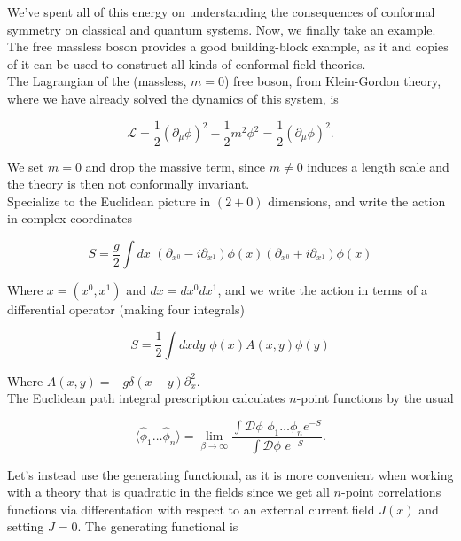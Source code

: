 
\noindent We've spent all of this energy on understanding the consequences of conformal symmetry on classical and quantum systems. Now, we finally take an example. The free massless boson provides a good building-block example, as it and copies of it can be used to construct all kinds of conformal field theories. \\

\noindent The Lagrangian of the (massless, $m=0$) free boson, from Klein-Gordon theory, where we have already solved the dynamics of this system, is

\begin{equation}
\mathcal{L} = \frac{1}{2} (\partial_\mu \phi)^2 - \frac{1}{2} m^2 \phi^2 = \frac{1}{2} (\partial_\mu \phi)^2.
\end{equation}

\noindent We set $m=0$ and drop the massive term, since $m \ne 0$ induces a length scale and the theory is then not conformally invariant. \\

\noindent Specialize to the Euclidean picture in $(2+0)$ dimensions, and write the action in complex coordinates

\begin{equation}
S = \frac{g}{2} \int dx \,\, (\partial_{x^0} - i \partial_{x^1} ) \phi (x) (\partial_{x^0} + i \partial_{x^1} ) \phi (x)
\end{equation}

\noindent Where $x = (x^0, x^1)$ and $dx = dx^0 dx^1$, and we write the action in terms of a differential operator (making four integrals)

\begin{equation}
S = \frac{1}{2} \int dx dy \,\, \phi (x) A (x,y) \phi (y)
\end{equation}

\noindent Where $A(x,y) = -g \delta (x-y) \partial_x^2$. \\

\noindent The Euclidean path integral prescription calculates $n$-point functions by the usual

\begin{equation}
\langle \hat{\phi}_1 \dots \hat{\phi}_n \rangle = \lim_{\beta \rightarrow \infty} \frac{\int \mathcal{D} \phi \,\, \phi_1 \dots \phi_n e^{-S}}{\int \mathcal{D} \phi \,\, e^{-S}}.
\end{equation}

\noindent Let's instead use the generating functional, as it is more convenient when working with a theory that is quadratic in the fields since we get all $n$-point correlations functions via differentation with respect to an external current field $J(x)$ and setting $J=0$. The generating functional is

